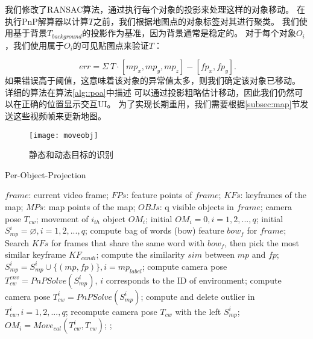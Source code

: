 我们修改了RANSAC算法，通过执行每个对象的投影来处理这样的对象移动。
在执行PnP解算器以计算$T$之前，我们根据地图点的对象标签对其进行聚类。
我们使用基于背景$T_{background}$的投影作为基准，因为背景通常是稳定的。
对于每个对象$O_i$，我们使用属于$O_i$的可见贴图点来验证$T$：

\begin{equation}\label{equ:gdt}
\
err = \Sigma \ T \cdot [mp_x, mp_y, mp_z] - [fp_x, fp_y].
\end{equation}
如果错误高于阈值，这意味着该对象的异常值太多，则我们确定该对象已移动。
详细的算法在算法\ref{alg::poa}中描述
可以通过投影粗略估计移动，因此我们仍然可以在正确的位置显示交互UI。
为了实现长期重用，我们需要根据\ref{subsec:map}节发送这些视频帧来更新地图。


\begin{figure}[t]
	\centering
	\texttt{[image: moveobj]}
	\caption{静态和动态目标的识别}
	\label{fig:move}
\end{figure}

\begin{algorithm}[t]  
	\caption{Per-Object-Projection }  
	\label{alg::poa}  
	\begin{algorithmic}[1]  
		\Require  
		$frame$: current video frame;
		$FPs$: feature points of $frame$;  
		$KFs$: keyframes of the map;  
		$MPs$: map points of the map;
		$OBJs$: q visible objects in $frame$;   
		\Ensure  
		camera pose $T_{cw}$;
		movement of $i_{th}$ object $OM_i$;
		\State initial $OM_i=0, i = 1,2,...,q$;
		\State initial $S_{mp}^i=\varnothing, i=1,2,...,q$;
		\State compute bag of words (bow) feature $bow_f$ for $frame$;
		\State Search $KFs$ for frames that share the same word with $bow_f$, then pick the most similar keyframe $KF_{candi}$;
		\For{each $mp\in KF_{candi}$}
		compute the similarity $sim$ between $mp$ and $fp$;
		\State $S_{mp}^i = S_{mp}^i\cup\{(mp,fp)\}, i = mp_{label}$;
		\EndIf
		\EndFor 
		\EndFor
		\State compute camera pose $T_{cw}^{env} = PnPSolve(S_{mp}^i)$, $i$ corresponds to the ID of environment;
		\For{each $obj\in OBJs$}
		\State compute camera pose $T_{cw}^{i} = PnPSolve(S_{mp}^i)$;
		\EndFor
		\EndFor
		\State compute and delete outlier in ${T_{cw}^{i}, i=1,2,...,q}$;
		\State recompute camera pose $T_{cw}$ with the left $S_{mp}^i$;
		\State $OM_i = Move_{cal}(T_{cw}^{i}, T_{cw})$; 
		\Else 
		;
		\EndIf
	\end{algorithmic}
\end{algorithm}  

